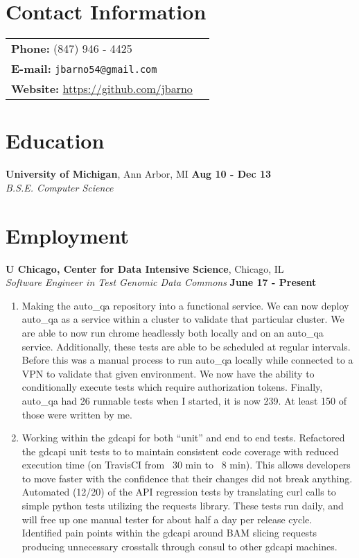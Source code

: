 \documentclass[margin,line]{res}
\begin{document}
\address{ 5467 S Ingleside Ave}
\address{ APT 3W, Chicago IL} 

\begin{resume}

\section{\sc Contact Information}
\begin{tabular}{@{}p{3in}p{4in}}
{\bf Phone:}   (847) 946 - 4425\\
{\bf E-mail:}  {\tt jbarno54@gmail.com} \\
{\bf Website:} \url{https://github.com/jbarno} \\
\end{tabular}


\section{\sc Education}
  {\bf University of Michigan}, Ann Arbor, MI \hfill {\bf Aug 10  - Dec 13}\\
  {\em B.S.E. Computer Science}


\section{\sc Employment}
  {\bf U Chicago, Center for Data Intensive Science}, Chicago, IL\\
  {\em Software Engineer in Test Genomic Data Commons} \hfill {\bf  June 17 - Present}

\begin{enumerate}
  \item Making the auto\_qa repository into a functional service. We can now deploy auto\_qa as a service within
a cluster to validate that particular cluster. We are able to now run chrome headlessly both locally and on
an auto\_qa service. Additionally, these tests are able to be scheduled at regular intervals. Before this was
a manual process to run auto\_qa locally while connected to a VPN to validate that given environment. We
now have the ability to conditionally execute tests which require authorization tokens. Finally, auto\_qa had
26 runnable tests when I started, it is now 239. At least 150 of those were written by me.
  \item Working within the gdcapi for both “unit” and end to end tests. Refactored the gdcapi unit tests to to
maintain consistent code coverage with reduced execution time (on TravisCI from ~30 min to ~8 min).
This allows developers to move faster with the confidence that their changes did not break anything.
Automated (12/20) of the API regression tests by translating curl calls to simple
python tests utilizing the requests library. These tests run daily, and will free up one manual tester for
about half a day per release cycle. Identified pain points within the gdcapi around BAM slicing requests
producing unnecessary crosstalk through consul to other gdcapi machines.
\end{enumerate}


\end{resume}
\end{document}
